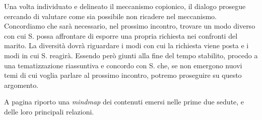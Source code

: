 \noindent Una volta individuato e delineato il meccanismo copionico, il dialogo prosegue cercando di valutare come sia possibile non ricadere nel meccanismo. Concordiamo che sarà necessario, nel prossimo incontro, trovare un modo diverso con cui S. possa affrontare di esporre una propria richiesta nei confronti del marito. La diversità dovrà riguardare i modi con cui la richiesta viene posta e i modi in cui S. reagirà. Essendo però giunti alla fine del tempo stabilito, procedo a una tematizzazione riassuntiva e concordo con S. che, se non emergono nuovi temi di cui voglia parlare al prossimo incontro, potremo proseguire su questo argomento.

A pagina \pageref{fig:seduta1-2} riporto una \emph{mindmap} dei contenuti emersi nelle prime due sedute, e delle loro principali relazioni.